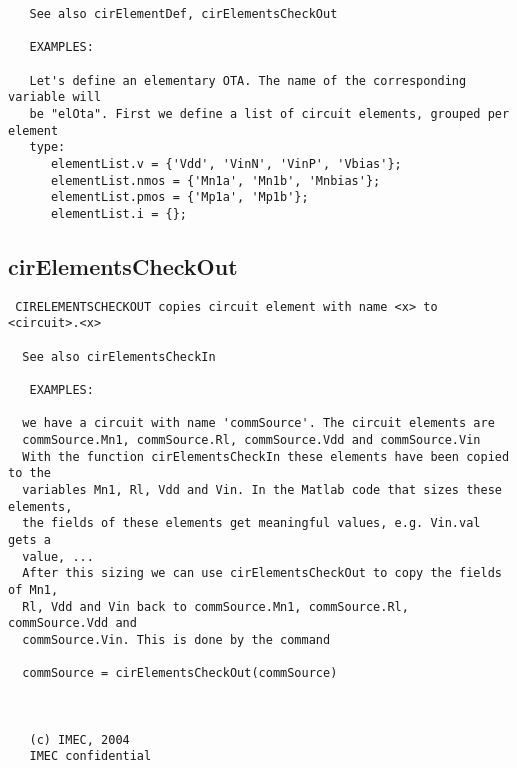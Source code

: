 \begin{verbatim}
   See also cirElementDef, cirElementsCheckOut
 
   EXAMPLES: 
 
   Let's define an elementary OTA. The name of the corresponding variable will
   be "elOta". First we define a list of circuit elements, grouped per element
   type: 
      elementList.v = {'Vdd', 'VinN', 'VinP', 'Vbias'};
      elementList.nmos = {'Mn1a', 'Mn1b', 'Mnbias'};
      elementList.pmos = {'Mp1a', 'Mp1b'};
      elementList.i = {};

\end{verbatim}

\newpage
\subsection{cirElementsCheckOut}
\label{sec:cirElementsCheckOut}
\begin{verbatim}
 CIRELEMENTSCHECKOUT copies circuit element with name <x> to <circuit>.<x>
 
  See also cirElementsCheckIn
 
   EXAMPLES:
 
  we have a circuit with name 'commSource'. The circuit elements are
  commSource.Mn1, commSource.Rl, commSource.Vdd and commSource.Vin
  With the function cirElementsCheckIn these elements have been copied to the
  variables Mn1, Rl, Vdd and Vin. In the Matlab code that sizes these elements,
  the fields of these elements get meaningful values, e.g. Vin.val gets a
  value, ...
  After this sizing we can use cirElementsCheckOut to copy the fields of Mn1,
  Rl, Vdd and Vin back to commSource.Mn1, commSource.Rl, commSource.Vdd and
  commSource.Vin. This is done by the command
 
  commSource = cirElementsCheckOut(commSource)
 
 
 
   (c) IMEC, 2004
   IMEC confidential 
 

\end{verbatim}

\newpage
